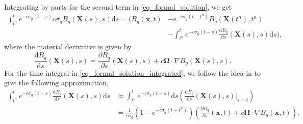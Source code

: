 \documentclass[preprint,12pt]{elsarticle}
\theoremstyle{definition}
\theoremstyle{plain}
\numberwithin{equation}{section}
\numberwithin{algorithm}{section}
\newcounter{eq_count}
\newcounter{tab_count}
\newcommand{\vOmega}{\mathbf{\Omega}}
\newcommand{\vx}{\mathbf{x}}
\newcommand{\mfx}{{\mathbf{X}}}
\newcommand{\dd}{{\text{d}}}
\newcommand{\pdrv}[2]{\frac{\partial{#1}}{\partial{#2}}}
\begin{document}
Integrating by parts for the second term in \eqref{eq_formal_solution}, we get
    \begin{equation}\label{eq_formal_solution_integrated}
        \begin{aligned}
           \int_{t^n}^{t} e^{- c  \sigma_g (t - s )}  c\sigma_{g} B_g ( \mfx(s),  s )\dd{s}
           =   \Bigg (  B_g(\vx,t) &  - e^{- c  \sigma_g (t - t^n )}
            B_g( \mfx(t^n),t^n )
            \\
            & - \int_{t^n}^t e^{- c  \sigma_g (t - s )} \frac{\dd{B_g}}{\dd{s }}( \mfx(s ),s ) \dd{s } \Bigg ),
        \end{aligned}
    \end{equation}
    where the material derivative is given by
    \begin{equation*}
        \frac{\dd{B_g}}{\dd{s }}( \mfx(s ),s ) = \pdrv{B_g}{s}( \mfx(s ),s )  + c \vOmega \cdot \nabla B_g ( \mfx(s ),s )  .
    \end{equation*}
For the time integral in \eqref{eq_formal_solution_integrated},  we follow the idea in \cite{shi2023efficient,zhang2023asymptotic,cai2024asymptotic} to  give the following approximation,
    \begin{equation} \label{eq_lastTerm2}
        \begin{aligned}
             \int_{t^n}^t e^{- c  \sigma_g (t - s )} \frac{\dd{B_g}}{\dd{s }}( \mfx(s ),s ) \dd{s } 
            &\approx     \int_{t^n}^t e^{- c \sigma_g (t - s  )     } \dd{s} \left( 
 \frac{\dd{B_g}}{\dd{s}}(\mfx(s),s)  \Bigg|_{s = t} \right) 
                        \\
            &= \frac{1}{c\sigma_g} (1 -  e^{- c \sigma_g (t - t^{n} ) } ) \left( \pdrv{B_g}{s}(\vx,t) +  c \vOmega \cdot \nabla B_g(\vx,t)  \right) .
        \end{aligned}
    \end{equation}
\end{document}
